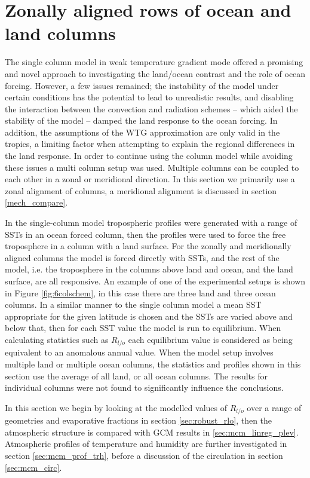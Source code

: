 \clearpage

\section{Zonally aligned rows of ocean and land columns}
\label{mech_mcm}

The single column model in weak temperature gradient mode offered a promising 
and novel approach to investigating the land/ocean contrast and the role of 
ocean forcing.  However, a few issues remained; the instability of the model 
under certain conditions has the potential to lead to unrealistic results, and 
disabling the interaction between the convection and radiation schemes -- which 
aided the stability of the model -- damped the land response to the ocean 
forcing.  In addition, the assumptions of the WTG approximation are only valid 
in the tropics, a limiting factor when attempting to explain the regional 
differences in the land response.  In order to continue using the column model 
while avoiding these issues a multi column setup was used. Multiple columns can 
be coupled to each other in a zonal or meridional direction. In this section we 
primarily use a zonal alignment of columns, a meridional alignment is discussed 
in section \ref{mech_compare}.

In the single-column model tropospheric profiles were generated with a range of 
SSTs in an ocean forced column, then the profiles were used to force the free 
troposphere in a column with a land surface. For the zonally and meridionally 
aligned columns the model is forced directly with SSTs, and the rest of the 
model, i.e. the troposphere in the columns above land and ocean, and the land 
surface, are all responsive. An example of one of the experimental setups is 
shown in Figure \ref{fig:6colschem}, in this case there are three land and three 
ocean columns. In a similar manner to the single column model a mean SST 
appropriate for the given latitude is chosen and the SSTs are varied above and 
below that, then for each SST value the model is run to equilibrium. When 
calculating statistics such as $R_{l/o}$ each equilibrium value is considered as 
being equivalent to an anomalous annual value. When the model setup involves 
multiple land or multiple ocean columns, the statistics and profiles shown in 
this section use the average of all land, or all ocean columns. The results for 
individual columns were not found to significantly influence the conclusions.

In this section we begin by looking at the modelled values of $R_{l/o}$ over a 
range of geometries and evaporative fractions in section \ref{sec:robust_rlo}, 
then the atmospheric structure is compared with GCM results in 
\ref{sec:mcm_linreg_plev}. Atmospheric profiles of temperature and humidity are 
further investigated in section \ref{sec:mcm_prof_trh}, before a discussion of 
the circulation in section \ref{sec:mcm_circ}.

